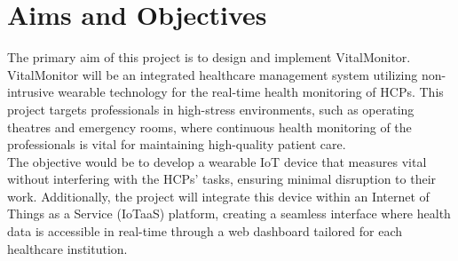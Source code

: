 


\section{Aims and Objectives}

The primary aim of this project is to design and implement VitalMonitor. VitalMonitor will be an integrated healthcare management system utilizing non-intrusive wearable technology for the real-time health monitoring of HCPs. This project targets professionals in high-stress environments, such as operating theatres and emergency rooms, where continuous health monitoring of the professionals is vital for maintaining high-quality patient care.\\

\noindent The objective would be to develop a wearable IoT device that measures vital without interfering with the HCPs' tasks, ensuring minimal disruption to their work. Additionally, the project will integrate this device within an Internet of Things as a Service (IoTaaS) platform, creating a seamless interface where health data is accessible in real-time through a web dashboard tailored for each healthcare institution.\\

